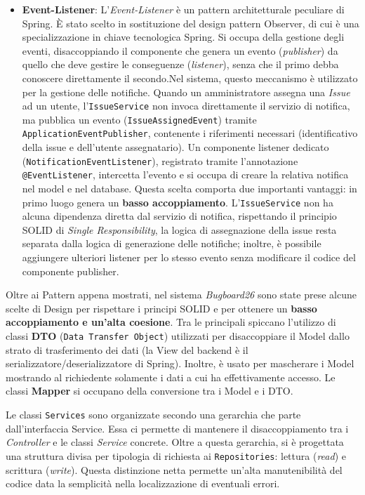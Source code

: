 \documentclass[a4paper,12pt]{article}
\begin{document}
\begin{itemize}
    \item \textbf{Event-Listener}: L'\textit{Event-Listener} è un pattern architetturale peculiare di Spring. È stato scelto in sostituzione del design pattern Observer, di cui è una specializzazione in chiave tecnologica Spring. Si occupa della gestione degli eventi, disaccoppiando il componente che genera un evento (\textit{publisher}) da quello che deve gestire le conseguenze (\textit{listener}), senza che il primo debba conoscere direttamente il secondo.Nel sistema, questo meccanismo è utilizzato per la gestione delle notifiche. Quando un amministratore assegna una \textit{Issue} ad un utente, l'\texttt{IssueService} non invoca direttamente il servizio di notifica, ma pubblica un evento (\texttt{IssueAssignedEvent}) tramite \texttt{ApplicationEventPublisher}, contenente i riferimenti necessari (identificativo della issue e dell'utente assegnatario). Un componente listener dedicato (\texttt{NotificationEventListener}), registrato tramite l'annotazione \texttt{@EventListener}, intercetta l'evento e si occupa di creare la relativa notifica nel model e nel database. Questa scelta comporta due importanti vantaggi: in primo luogo genera un \textbf{basso accoppiamento}. L'\texttt{IssueService} non ha alcuna dipendenza diretta dal servizio di notifica, rispettando il principio SOLID di \textit{Single Responsibility}, la logica di assegnazione della issue resta separata dalla logica di generazione delle notifiche; inoltre, è possibile aggiungere ulteriori listener per lo stesso evento senza modificare il codice del componente publisher.
\end{itemize}

Oltre ai Pattern appena mostrati, nel sistema \textit{Bugboard26} sono state prese alcune scelte di Design per rispettare i principi SOLID e per ottenere un \textbf{basso accoppiamento e un'alta coesione}. Tra le principali spiccano l'utilizzo di classi \textbf{DTO} (\texttt{Data Transfer Object}) utilizzati per disaccoppiare il Model dallo strato di trasferimento dei dati (la View del backend è il serializzatore/deserializzatore di Spring). Inoltre, è usato per mascherare i Model mostrando al richiedente solamente i dati a cui ha effettivamente accesso. Le classi \textbf{Mapper} si occupano della conversione tra i Model e i DTO.

Le classi \texttt{Services} sono organizzate secondo una gerarchia che parte dall'interfaccia Service. Essa ci permette di mantenere il disaccoppiamento tra i \textit{Controller} e le classi \textit{Service} concrete. Oltre a questa gerarchia, si è progettata una struttura divisa per tipologia di richiesta ai \texttt{Repositories}: lettura (\textit{read}) e scrittura (\textit{write}). Questa distinzione netta permette un'alta manutenibilità del codice data la semplicità nella localizzazione di eventuali errori. 
\end{document}
